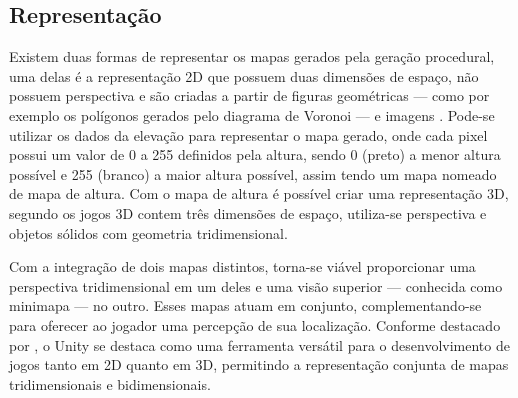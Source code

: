 \subsection{Representação}

Existem duas formas de representar os mapas gerados pela geração procedural, uma delas é a representação 2D que possuem duas dimensões de espaço, não possuem perspectiva e são criadas a partir de figuras geométricas — como por exemplo os polígonos gerados pelo diagrama de Voronoi — e imagens \cite{unitywebpage}. Pode-se utilizar os dados da elevação para representar o mapa gerado, onde cada pixel possui um valor de 0 a 255 definidos pela altura, sendo 0 (preto) a menor altura possível e 255 (branco) a maior altura possível, assim tendo um mapa nomeado de mapa de altura. Com o mapa de altura é possível criar uma representação 3D, segundo  os jogos 3D contem três dimensões de espaço, utiliza-se perspectiva e objetos sólidos com geometria tridimensional.

Com a integração de dois mapas distintos, torna-se viável proporcionar uma perspectiva tridimensional em um deles e uma visão superior — conhecida como minimapa — no outro. Esses mapas atuam em conjunto, complementando-se para oferecer ao jogador uma percepção de sua localização. Conforme destacado por , o Unity se destaca como uma ferramenta versátil para o desenvolvimento de jogos tanto em 2D quanto em 3D, permitindo a representação conjunta de mapas tridimensionais e bidimensionais.